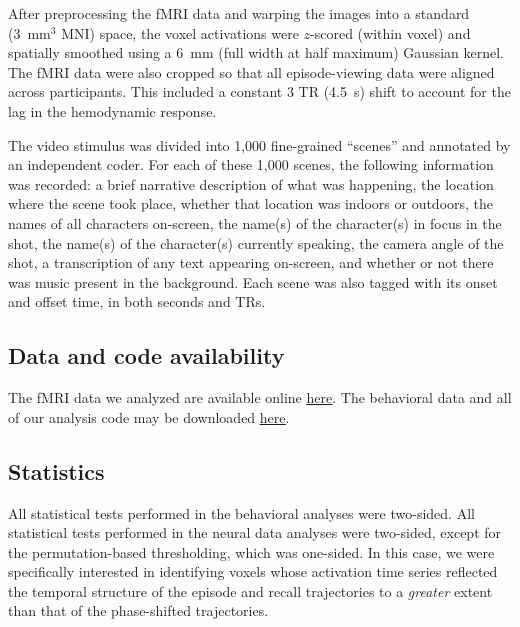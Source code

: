 \documentclass[10pt]{article}
\begin{document}
After preprocessing the fMRI data and warping the images into a standard (3~mm$^3$ MNI) space, the voxel activations were $z$-scored (within voxel) and spatially smoothed using a 6~mm (full width at half maximum) Gaussian kernel.  The fMRI data were also cropped so that all episode-viewing data were aligned across participants.  This included a constant 3 TR (4.5~s) shift to account for the lag in the hemodynamic response.  \citep[All of these preprocessing steps followed][where additional details may be found.]{ChenEtal17}

The video stimulus was divided into 1,000 fine-grained ``scenes'' and annotated by an independent coder.  For each of these 1,000 scenes, the following information was recorded: a brief narrative description of what was happening, the location where the scene took place, whether that location was indoors or outdoors, the names of all characters on-screen, the name(s) of the character(s) in focus in the shot, the name(s) of the character(s) currently speaking, the camera angle of the shot, a transcription of any text appearing on-screen, and whether or not there was music present in the background.  Each scene was also tagged with its onset and offset time, in both seconds and TRs.

\subsection*{Data and code availability}
The fMRI data we analyzed are available online \href{http://dataspace.princeton.edu/jspui/handle/88435/dsp01nz8062179}{\underline{here}}.  The behavioral data and all of our analysis code may be downloaded \href{https://github.com/ContextLab/sherlock-topic-model-paper}{\underline{here}}.

\subsection*{Statistics}
All statistical tests performed in the behavioral analyses were two-sided.  All statistical tests performed in the neural data analyses were two-sided, except for the permutation-based thresholding, which was one-sided.  In this case, we were specifically interested in identifying voxels whose activation time series reflected the temporal structure of the episode and recall trajectories to a \textit{greater} extent than that of the phase-shifted trajectories.
\end{document}
